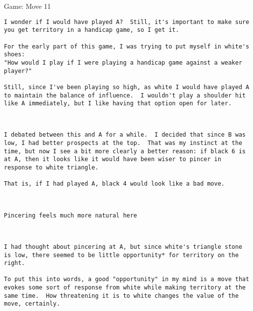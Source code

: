 \documentclass{article}
\begin{document}
\begin{section}{Game: Move 11}
\begin{center}
\begin{lstlisting}
I wonder if I would have played A?  Still, it's important to make sure you get territory in a handicap game, so I get it.

For the early part of this game, I was trying to put myself in white's shoes:
"How would I play if I were playing a handicap game against a weaker player?"

Still, since I've been playing so high, as white I would have played A to maintain the balance of influence.  I wouldn't play a shoulder hit like A immediately, but I like having that option open for later.\end{lstlisting}
\end{center}
\begin{center}
\cleargoban
{}
\showfullgoban
\\\begin{lstlisting}
I debated between this and A for a while.  I decided that since B was low, I had better prospects at the top.  That was my instinct at the time, but now I see a bit more clearly a better reason: if black 6 is at A, then it looks like it would have been wiser to pincer in response to white triangle.

That is, if I had played A, black 4 would look like a bad move.\end{lstlisting}
\end{center}
\begin{center}
\cleargoban
{}
\showfullgoban
\\\begin{lstlisting}
Pincering feels much more natural here\end{lstlisting}
\end{center}
\begin{center}
\cleargoban
{}
\showfullgoban
\\\begin{lstlisting}
I had thought about pincering at A, but since white's triangle stone is low, there seemed to be little opportunity* for territory on the right.

To put this into words, a good "opportunity" in my mind is a move that evokes some sort of response from white while making territory at the same time.  How threatening it is to white changes the value of the move, certainly.


\end{lstlisting}
\end{center}
\end{section}
\end{document}
